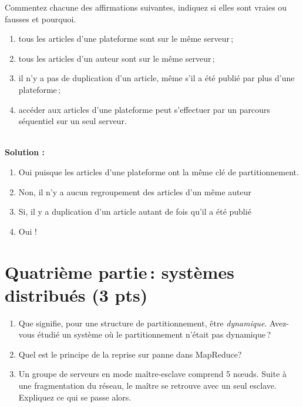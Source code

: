 \documentclass[11pt,a4paper]{article}
\newenvironment{solution}[0]{
~\\ \color{red} \textbf{Solution : }\color{black}}{%
}
\begin{document}
Commentez chacune des affirmations suivantes, indiquez si elles
sont vraies ou fausses et pourquoi.

  \begin{enumerate}
	\item tous les articles d'une plateforme sont sur le même serveur\,;
    \item tous les articles d'un auteur sont sur le même serveur\,;
	\item il n'y a pas de duplication d'un article, même s'il
	    a été publié par plus d'une plateforme\,;
    \item accéder aux articles d'une plateforme peut s'effectuer
	    par un parcours séquentiel sur un seul serveur.
  \end{enumerate}  
  

  \begin{solution}
  \begin{enumerate}
    \item Oui puisque les articles d'une plateforme ont la même clé de partitionnement.
     \item Non, il n'y a aucun regroupement des articles d'un même auteur
     \item Si, il y a duplication d'un article autant de fois qu'il a été publié
     \item Oui !
  \end{enumerate} 
\end{solution}

\section*{Quatrième partie\,: systèmes distribués (3 pts)}


\begin{enumerate}

  \item Que signifie, pour  une structure de partitionnement, être \emph{dynamique}. Avez-vous
     étudié un système où le partitionnement n'était pas dynamique\,?
   
	 \item Quel est le principe de la reprise sur panne dans MapReduce?\,
   
   \item Un groupe de serveurs en mode maître-esclave comprend 5 n{\oe}uds. Suite à une fragmentation
du réseau, le maître se retrouve  avec un seul esclave.  Expliquez ce qui se passe alors.
   
\end{enumerate}
\end{document}
